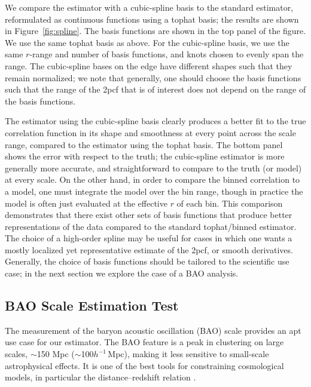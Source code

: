 \documentclass[modern]{aastex62}
\newcommand{\cf}{2pcf\xspace} %
\newcommand{\hmpc}{$h^{-1}\,$Mpc}
\begin{document}
We compare the estimator with a cubic-spline basis to the standard estimator, reformulated as continuous functions using a tophat basis; the results are shown in Figure~\ref{fig:spline}.
The basis functions are shown in the top panel of the figure.
We use the same tophat basis as above.
For the cubic-spline basis, we use the same $r$-range and number of basis functions, and knots chosen to evenly span the range. 
The cubic-spline bases on the edge have different shapes such that they remain normalized; we note that generally, one should choose the basis functions such that the range of the \cf that is of interest does not depend on the range of the basis functions.

The estimator using the cubic-spline basis clearly produces a better fit to the true correlation function in its shape and smoothness at every point across the scale range, compared to the estimator using the tophat basis.
The bottom panel shows the error with respect to the truth; the cubic-spline estimator is more generally more accurate, and straightforward to compare to the truth (or model) at every scale.
On the other hand, in order to compare the binned correlation to a model, one must integrate the model over the bin range, though in practice the model is often just evaluated at the effective $r$ of each bin.
This comparison demonstrates that there exist other sets of basis functions that produce better representations of the data compared to the standard tophat/binned estimator.
The choice of a high-order spline may be useful for cases in which one wants a mostly localized yet representative estimate of the \cf, or smooth derivatives.
Generally, the choice of basis functions should be tailored to the scientific use case; in the next section we explore the case of a BAO analysis.


\subsection{BAO Scale Estimation Test}
\label{sec:bao}

The measurement of the baryon acoustic oscillation (BAO) scale provides an apt use case for our estimator.
The BAO feature is a peak in clustering on large scales, $\sim$150 Mpc ($\sim$100\hmpc), making it less sensitive to small-scale astrophysical effects.
It is one of the best tools for constraining cosmological models, in particular the distance--redshift relation \citep{Eisenstein2005, Kazin2010, Anderson2012, Anderson2014, Alam2016}.
\end{document}
